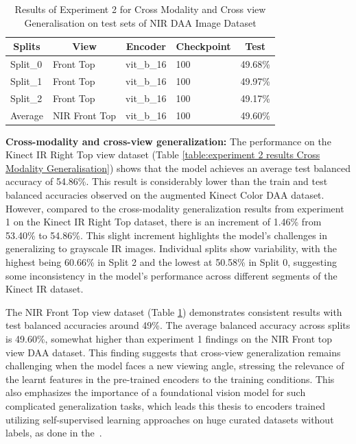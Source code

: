 \begin{table}[htbp]
\caption{Results of Experiment 2 for Cross Modality and Cross view Generalisation on test sets of NIR DAA Image Dataset}
\label{table:experiment 2 results Cross Modality and view Generalisation on NIR}
\centering
\begin{tabular}{lllll}
\multicolumn{1}{c}{\textbf{Splits}} & \multicolumn{1}{c}{\textbf{View}} & \multicolumn{1}{c}{\textbf{Encoder}} & \multicolumn{1}{c}{\textbf{Checkpoint}} & \multicolumn{1}{c}{\textbf{Test}}\\
\hline
Split\_0 & Front Top & vit\_b\_16 & 100 & 49.68\% \\
Split\_1 & Front Top & vit\_b\_16 & 100 & 49.97\% \\
Split\_2 & Front Top & vit\_b\_16 & 100 & 49.17\% \\
\hline
Average & NIR Front Top & vit\_b\_16 & 100 & 49.60\% \\
\hline
\end{tabular}
\end{table}

\textbf{Cross-modality and cross-view generalization:}
The performance on the Kinect IR Right Top view dataset (Table \ref{table:experiment 2 results Cross Modality Generalisation}) shows that the model achieves an average test balanced accuracy of 54.86\%. This result is considerably lower than the train and test balanced accuracies observed on the augmented Kinect Color DAA dataset. However, compared to the cross-modality generalization results from experiment 1 on the Kinect IR Right Top dataset, there is an increment of 1.46\% from 53.40\% to 54.86\%. This slight increment highlights the model's challenges in generalizing to grayscale IR images. Individual splits show variability, with the highest being 60.66\% in Split 2 and the lowest at 50.58\% in Split 0, suggesting some inconsistency in the model's performance across different segments of the Kinect IR dataset.

The NIR Front Top view dataset (Table \ref{table:experiment 2 results Cross Modality and view Generalisation on NIR}) demonstrates consistent results with test balanced accuracies around 49\%. The average balanced accuracy across splits is 49.60\%, somewhat higher than experiment 1 findings on the NIR Front top view DAA dataset. This finding suggests that cross-view generalization remains challenging when the model faces a new viewing angle, stressing the relevance of the learnt features in the pre-trained encoders to the training conditions.
This also emphasizes the importance of a foundational vision model for such complicated generalization tasks, which leads this thesis to encoders trained utilizing self-supervised learning approaches on huge curated datasets without labels, as done in the~\citep{dinov2_oquab2023dinov2}.
